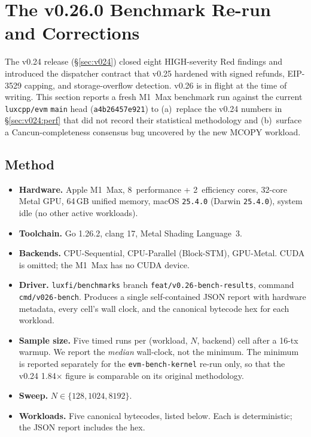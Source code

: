 \section{The v0.26.0 Benchmark Re-run and Corrections}
\label{sec:v026-benchmarks}

The v0.24 release (\S\ref{sec:v024}) closed eight HIGH-severity Red findings
and introduced the dispatcher contract that v0.25 hardened with signed
refunds, EIP-3529 capping, and storage-overflow detection. v0.26 is in
flight at the time of writing. This section reports a fresh M1~Max
benchmark run against the current \texttt{luxcpp/evm} \texttt{main} head
(\texttt{a4b26457e921}) to (a)~replace the v0.24 numbers in
\S\ref{sec:v024:perf} that did not record their statistical
methodology and (b)~surface a Cancun-completeness consensus bug uncovered
by the new MCOPY workload.

\subsection{Method}
\label{sec:v026:method}

\begin{itemize}
  \item \textbf{Hardware.} Apple M1~Max, 8~performance + 2~efficiency
    cores, 32-core Metal GPU, 64\,GB unified memory, macOS
    \texttt{25.4.0} (Darwin \texttt{25.4.0}), system idle (no other
    active workloads).
  \item \textbf{Toolchain.} Go 1.26.2, clang 17, Metal Shading
    Language~3.
  \item \textbf{Backends.} CPU-Sequential, CPU-Parallel (Block-STM),
    GPU-Metal. CUDA is omitted; the M1~Max has no CUDA device.
  \item \textbf{Driver.} \texttt{luxfi/benchmarks} branch
    \texttt{feat/v0.26-bench-results}, command
    \texttt{cmd/v026-bench}. Produces a single self-contained JSON
    report with hardware metadata, every cell's wall clock, and the
    canonical bytecode hex for each workload.
  \item \textbf{Sample size.} Five timed runs per
    (workload, $N$, backend) cell after a 16-tx warmup. We report
    the \emph{median} wall-clock, not the minimum. The minimum is
    reported separately for the \texttt{evm-bench-kernel} re-run only,
    so that the v0.24 1.84$\times$ figure is comparable on its
    original methodology.
  \item \textbf{Sweep.} $N \in \{128, 1024, 8192\}$.
  \item \textbf{Workloads.} Five canonical bytecodes, listed below.
    Each is deterministic; the JSON report includes the hex.
\end{itemize}

